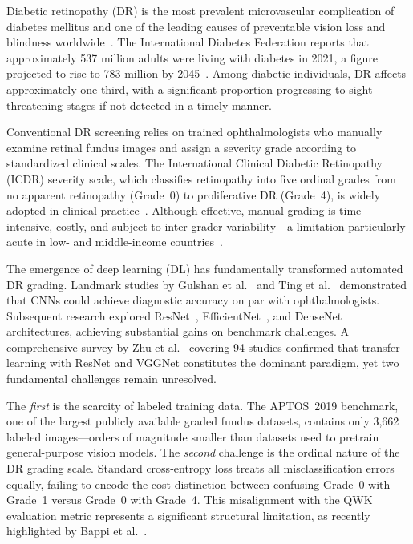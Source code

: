 \documentclass[10pt, twocolumn]{article}
\begin{document}
Diabetic retinopathy (DR) is the most prevalent microvascular complication of
diabetes mellitus and one of the leading causes of preventable vision loss and
blindness worldwide~\cite{yau2012}. The International Diabetes Federation reports
that approximately 537 million adults were living with diabetes in 2021, a figure
projected to rise to 783 million by 2045~\cite{idf2021}. Among diabetic
individuals, DR affects approximately one-third, with a significant proportion
progressing to sight-threatening stages if not detected in a timely manner.

Conventional DR screening relies on trained ophthalmologists who manually examine
retinal fundus images and assign a severity grade according to standardized clinical
scales. The International Clinical Diabetic Retinopathy (ICDR) severity scale,
which classifies retinopathy into five ordinal grades from no apparent retinopathy
(Grade~0) to proliferative DR (Grade~4), is widely adopted in clinical
practice~\cite{wilkinson2003}. Although effective, manual grading is
time-intensive, costly, and subject to inter-grader variability---a limitation
particularly acute in low- and middle-income countries~\cite{krause2018}.

The emergence of deep learning (DL) has fundamentally transformed automated DR
grading. Landmark studies by Gulshan et al.~\cite{gulshan2016} and Ting et
al.~\cite{ting2017} demonstrated that CNNs could achieve diagnostic accuracy on par
with ophthalmologists. Subsequent research explored ResNet~\cite{he2016},
EfficientNet~\cite{tan2019}, and DenseNet~\cite{huang2017} architectures, achieving
substantial gains on benchmark challenges. A comprehensive survey by Zhu et
al.~\cite{zhu2024} covering 94 studies confirmed that transfer learning with ResNet
and VGGNet constitutes the dominant paradigm, yet two fundamental challenges remain
unresolved.

The \textit{first} is the scarcity of labeled training data. The APTOS~2019
benchmark, one of the largest publicly available graded fundus datasets, contains
only 3,662 labeled images---orders of magnitude smaller than datasets used to
pretrain general-purpose vision models. The \textit{second} challenge is the
ordinal nature of the DR grading scale. Standard cross-entropy loss treats all
misclassification errors equally, failing to encode the cost distinction between
confusing Grade~0 with Grade~1 versus Grade~0 with Grade~4. This misalignment with
the QWK evaluation metric represents a significant structural limitation, as
recently highlighted by Bappi et al.~\cite{bappi2025}.
\end{document}

